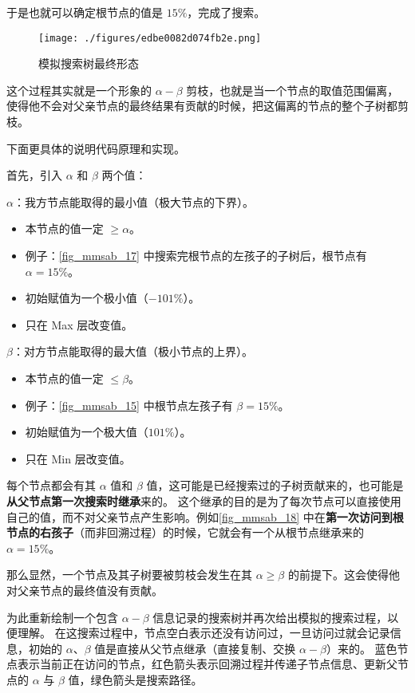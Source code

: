 于是也就可以确定根节点的值是 $15\%$，完成了搜索。

\begin{figure}[ht]
\centering
\texttt{[image: ./figures/edbe0082d074fb2e.png]}
\caption{模拟搜索树最终形态} \label{fig_mmsab_20}
\end{figure}

这个过程其实就是一个形象的 $\alpha-\beta$ 剪枝，也就是当一个节点的取值范围偏离，使得他不会对父亲节点的最终结果有贡献的时候，把这偏离的节点的整个子树都剪枝。

下面更具体的说明代码原理和实现。

首先，引入 $\alpha$ 和 $\beta$ 两个值：

$\alpha$：我方节点能取得的最小值（极大节点的下界）。
\begin{itemize}
\item 本节点的值一定 $\ge\alpha$。
\item 例子：\autoref{fig_mmsab_17} 中搜索完根节点的左孩子的子树后，根节点有 $\alpha = 15\%$。
\item 初始赋值为一个极小值（$-101\%$）。
\item 只在 Max 层改变值。
\end{itemize}

$\beta$：对方节点能取得的最大值（极小节点的上界）。
\begin{itemize}
\item 本节点的值一定 $\le \beta$。
\item 例子：\autoref{fig_mmsab_15} 中根节点左孩子有 $\beta = 15\%$。
\item 初始赋值为一个极大值（$101\%$）。
\item 只在 Min 层改变值。
\end{itemize}
每个节点都会有其 $\alpha$ 值和 $\beta$ 值，这可能是已经搜索过的子树贡献来的，也可能是\textbf{从父节点第一次搜索时继承}来的。
这个继承的目的是为了每次节点可以直接使用自己的值，而不对父亲节点产生影响。例如\autoref{fig_mmsab_18} 中在\textbf{第一次访问到根节点的右孩子}（而非回溯过程）的时候，它就会有一个从根节点继承来的 $\alpha = 15\%$。

那么显然，一个节点及其子树要被剪枝会发生在其 $\alpha \ge \beta$ 的前提下。这会使得他对父亲节点的最终值没有贡献。

为此重新绘制一个包含 $\alpha-\beta$ 信息记录的搜索树并再次给出模拟的搜索过程，以便理解。
在这搜索过程中，节点空白表示还没有访问过，一旦访问过就会记录信息，初始的 $\alpha$、$\beta$ 值是直接从父节点继承（直接复制、交换 $\alpha-\beta$）来的。
蓝色节点表示当前正在访问的节点，红色箭头表示回溯过程并传递子节点信息、更新父节点的 $\alpha$ 与 $\beta$ 值，绿色箭头是搜索路径。